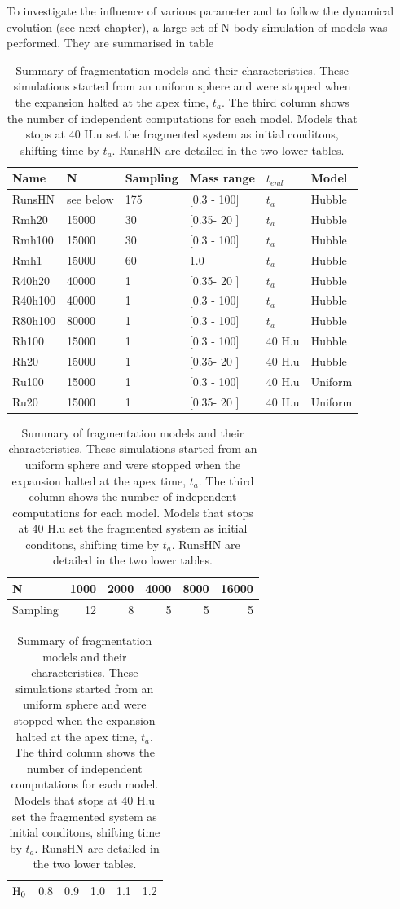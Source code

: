 To investigate the influence of various parameter and to follow the dynamical evolution (see next chapter), a large set of N-body simulation of \HubLem models was performed. They are summarised in table 

\begin{table}
\begin{center}
\caption{Summary of fragmentation models and their characteristics. These simulations started from an uniform sphere and were stopped when the expansion halted at the apex time, $t_a$. The third column shows the number of independent computations for each model. Models that stops at 40 H.u set the fragmented system as initial conditons, shifting time by $t_a$. RunsHN are detailed in the two lower tables.}
\label{Tab:2_models}
\begin{tabularx}{0.8\textwidth}{XXXXXX}
\hline
Name & N & Sampling & Mass range & $t_{end}$ & Model \\
\hline
RunsHN & see below & 175 & [0.3 - 100] & $t_a$ & Hubble \\
Rmh20 & 15000 & 30 & [0.35- 20 ] & $t_a$ & Hubble\\
Rmh100 & 15000 & 30 & [0.3 - 100] & $t_a$ & Hubble\\
Rmh1 & 15000 & 60 & 1.0  & $t_a$ & Hubble \\
R40h20 & 40000 & 1 & [0.35- 20 ] & $t_a$ & Hubble \\
R40h100 & 40000 & 1 & [0.3 - 100]& $t_a$ & Hubble \\
R80h100 & 80000 & 1 & [0.3 - 100] & $t_a$ & Hubble\\
Rh100 & 15000 & 1 & [0.3 - 100] & 40 H.u & Hubble \\
Rh20 & 15000 & 1 & [0.35- 20 ] & 40 H.u & Hubble\\
Ru100 & 15000 & 1 & [0.3 - 100]& 40 H.u & Uniform\\
Ru20 & 15000 & 1 & [0.35- 20 ] & 40 H.u & Uniform\\
\hline
\end{tabularx}
\end{center}
\begin{center}
\begin{tabular}{l|rrrrr}
\centering
N   & 1000 & 2000 & 4000 & 8000 & 16000\\ 
\hline
Sampling & 12 & 8 & 5 & 5 & 5\\
\end{tabular}
\end{center}
\begin{center}
\begin{tabular}{l|rrrrr}
${\textrm{H}}_0$ & 0.8 & 0.9 & 1.0 & 1.1 & 1.2
\end{tabular}
\end{center}
\end{table}






